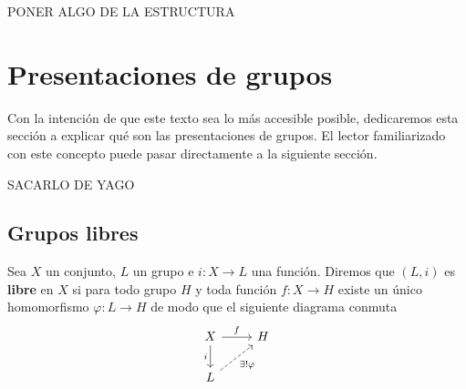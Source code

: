 \documentclass[bibtex, anon]{TEMat-article}
\begin{document}
PONER ALGO DE LA ESTRUCTURA
%

\section{Presentaciones de grupos}

Con la intención de que este texto sea lo más accesible posible, dedicaremos esta sección a explicar qué son las presentaciones de grupos. El lector familiarizado con este concepto puede pasar directamente a la siguiente sección. 

SACARLO DE YAGO

\subsection{Grupos libres}
\begin{definicion}
	Sea $X$ un conjunto, $L$ un grupo e $i:X\to L$ una función. Diremos que $(L,i)$ es \textbf{libre} en $X$ si para todo grupo $H$ y toda función $f:X\to H$ existe un único homomorfismo $\varphi:L\to H$ de modo que el siguiente diagrama conmuta
	\[
	\begin{tikzcd}
	X\arrow[r, "f"]\arrow[d,"i"'] & H\\
	L\arrow[ur, dashed, "\exists!\varphi"']
	\end{tikzcd}
	\]
\end{definicion}
\end{document}
